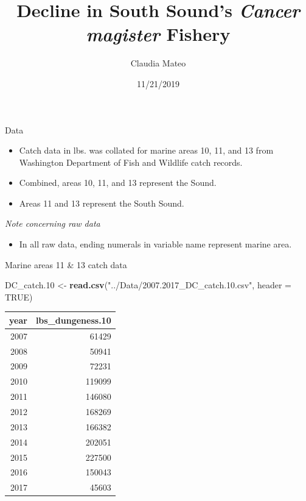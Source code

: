 \documentclass[ignorenonframetext,]{beamer}
\title{Decline in South Sound's \emph{Cancer magister} Fishery}
\author{Claudia Mateo}
\date{11/21/2019}
\newenvironment{Shaded}{\begin{snugshade}}{\end{snugshade}}
\newcommand{\KeywordTok}[1]{\textcolor[rgb]{0.13,0.29,0.53}{\textbf{#1}}}
\newcommand{\DataTypeTok}[1]{\textcolor[rgb]{0.13,0.29,0.53}{#1}}
\newcommand{\DecValTok}[1]{\textcolor[rgb]{0.00,0.00,0.81}{#1}}
\newcommand{\StringTok}[1]{\textcolor[rgb]{0.31,0.60,0.02}{#1}}
\newcommand{\OtherTok}[1]{\textcolor[rgb]{0.56,0.35,0.01}{#1}}
\newcommand{\NormalTok}[1]{#1}
\providecommand{\tightlist}{%
  \setlength{\itemsep}{0pt}\setlength{\parskip}{0pt}}
\begin{document}
\frame{\titlepage}

\begin{frame}{Data}

\begin{itemize}
\tightlist
\item
  Catch data in lbs. was collated for marine areas 10, 11, and 13 from
  Washington Department of Fish and Wildlife catch records.
\item
  Combined, areas 10, 11, and 13 represent the Sound.
\item
  Areas 11 and 13 represent the South Sound.
\end{itemize}

\emph{Note concerning raw data}

\begin{itemize}
\tightlist
\item
  In all raw data, ending numerals in variable name represent marine
  area.
\end{itemize}

\end{frame}

\begin{frame}[fragile]{Marine areas 11 \& 13 catch data}

\begin{Shaded}
\begin{Highlighting}[]
\NormalTok{DC_catch.}\DecValTok{10}\NormalTok{ <-}\StringTok{ }\KeywordTok{read.csv}\NormalTok{(}\StringTok{"../Data/2007.2017_DC_catch.10.csv"}\NormalTok{, }\DataTypeTok{header =} \OtherTok{TRUE}\NormalTok{)}
\end{Highlighting}
\end{Shaded}

\begin{longtable}[]{@{}rr@{}}
\toprule
year & lbs\_dungeness.10\tabularnewline
\midrule
\endhead
2007 & 61429\tabularnewline
2008 & 50941\tabularnewline
2009 & 72231\tabularnewline
2010 & 119099\tabularnewline
2011 & 146080\tabularnewline
2012 & 168269\tabularnewline
2013 & 166382\tabularnewline
2014 & 202051\tabularnewline
2015 & 227500\tabularnewline
2016 & 150043\tabularnewline
2017 & 45603\tabularnewline
\bottomrule
\end{longtable}

\end{frame}
\end{document}

